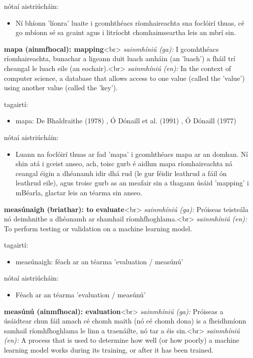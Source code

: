 \documentclass{article}
\begin{document}
nótaí aistriúcháin:
\begin{itemize}
	\item Ní bhíonn 'líonra' luaite i gcomhthéacs ríomhaireachta sna foclóirí thuas, cé go mbíonn sé sa gcaint agus i litríocht chomhaimseartha leis an mbrí sin.
\end{itemize}


\textbf{mapa (ainmfhocal): mapping}<br>
\textit{sainmhíniú (ga):} I gcomhthéacs ríomhaireachta, bunachar a ligeann duit luach amháin (an 'luach') a fháil trí cheangal le luach eile (an eochair).<br>
\textit{sainmhíniú (en):} In the context of computer science, a database that allows access to one value (called the 'value') using another value (called the 'key').

tagairtí:
\begin{itemize}
	\item mapa: De Bhaldraithe (1978) \cite{de-bhaldraithe}, Ó Dónaill et al. (1991) \cite{focloir-beag}, Ó Dónaill (1977) \cite{odonaill}
\end{itemize}

nótaí aistriúcháin:
\begin{itemize}
	\item Luann na foclóirí thuas ar fad 'mapa' i gcomhthéacs mapa ar an domhan. Ní shin atá i gceist anseo, ach, toisc gurb é aidhm mapa ríomhaireachta ná ceangal éigin a dhéanamh idir dhá rud (le gur féidir leathrud a fáil ón leathrud eile), agus troisc gurb as an meafair sin a thagann úsáid 'mapping' i mBéarla, glactar leis an téarma sin anseo.
\end{itemize}


\textbf{measúnaigh (briathar): to evaluate}<br>
\textit{sainmhíniú (ga):} Próiseas teisteála nó deimhnithe a dhéanamh ar shamhail ríomhfhoghlama.<br>
\textit{sainmhíniú (en):} To perform testing or validation on a machine learning model.

tagairtí:
\begin{itemize}
	\item measúnaigh: féach ar an téarma 'evaluation / measúnú'
\end{itemize}

nótaí aistriúcháin:
\begin{itemize}
	\item Féach ar an téarma 'evaluation / measúnú'
\end{itemize}


\textbf{measúnú (ainmfhocal): evaluation}<br>
\textit{sainmhíniú (ga):} Próiseas a úsáidtear chun fáil amach cé chomh maith (nó cé chomh dona) is a fheidhmíonn samhail ríomhfhoghlama le linn a traenáilte, nó tar a éis sin.<br>
\textit{sainmhíniú (en):} A process that is used to determine how well (or how poorly) a machine learning model works during its training, or after it has been trained.
\end{document}
